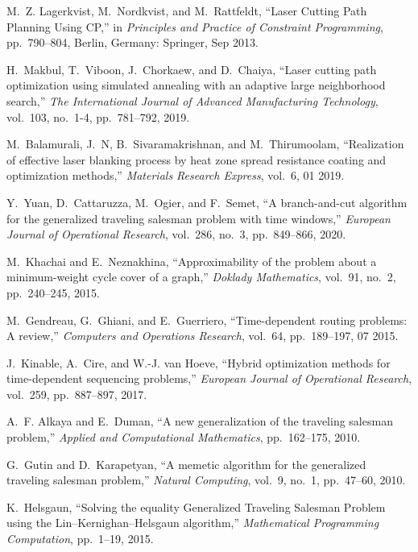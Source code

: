 \begin{thebibliography}{10}
M.~Z. Lagerkvist, M.~Nordkvist, and M.~Rattfeldt, ``{Laser Cutting Path
  Planning Using CP},'' in {\em {Principles and Practice of Constraint
  Programming}}, pp.~790--804, Berlin, Germany: Springer, Sep 2013.

H.~Makbul, T.~Viboon, J.~Chorkaew, and D.~Chaiya, ``Laser cutting path
  optimization using simulated annealing with an adaptive large neighborhood
  search,'' {\em The International Journal of Advanced Manufacturing
  Technology}, vol.~103, no.~1-4, pp.~781--792, 2019.

M.~Balamurali, J.~N, B.~Sivaramakrishnan, and M.~Thirumoolam, ``Realization of
  effective laser blanking process by heat zone spread resistance coating and
  optimization methods,'' {\em Materials Research Express}, vol.~6, 01 2019.

Y.~Yuan, D.~Cattaruzza, M.~Ogier, and F.~Semet, ``A branch-and-cut algorithm
  for the generalized traveling salesman problem with time windows,'' {\em
  European Journal of Operational Research}, vol.~286, no.~3, pp.~849--866,
  2020.

M.~Khachai and E.~Neznakhina, ``Approximability of the problem about a
  minimum-weight cycle cover of a graph,'' {\em Doklady Mathematics}, vol.~91,
  no.~2, pp.~240--245, 2015.

M.~Gendreau, G.~Ghiani, and E.~Guerriero, ``Time-dependent routing problems: A
  review,'' {\em Computers and Operations Research}, vol.~64, pp.~189--197, 07
  2015.

J.~Kinable, A.~Cire, and W.-J. van Hoeve, ``Hybrid optimization methods for
  time-dependent sequencing problems,'' {\em European Journal of Operational
  Research}, vol.~259, pp.~887--897, 2017.

A.~F. Alkaya and E.~Duman, ``A new generalization of the traveling salesman
  problem,'' {\em Applied and Computational Mathematics}, pp.~162--175, 2010.

G.~Gutin and D.~Karapetyan, ``A memetic algorithm for the generalized traveling
  salesman problem,'' {\em Natural Computing}, vol.~9, no.~1, pp.~47--60, 2010.

K.~Helsgaun, ``Solving the equality {G}eneralized {T}raveling {S}alesman
  {P}roblem using the {L}in--{K}ernighan--{H}elsgaun algorithm,'' {\em
  Mathematical Programming Computation}, pp.~1--19, 2015.


\end{thebibliography}
